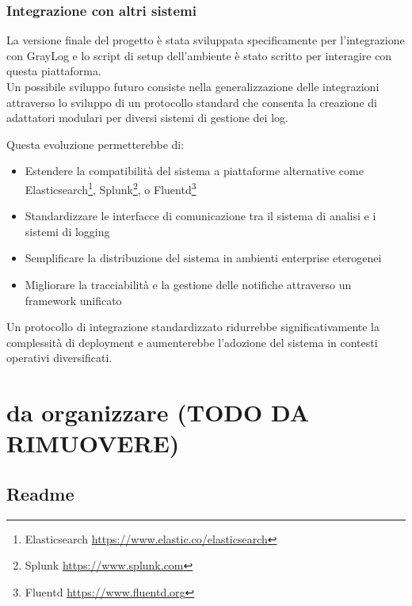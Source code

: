 \documentclass[12pt]{report}
\begin{document}
\subsection{Integrazione con altri sistemi}
\label{subsec:integrazione_sistemi}

La versione finale del progetto è stata sviluppata specificamente per l'integrazione con GrayLog e lo script di setup dell'ambiente è stato scritto per interagire con questa piattaforma. \\
Un possibile sviluppo futuro consiste nella generalizzazione delle integrazioni attraverso lo sviluppo di un protocollo standard che consenta la creazione di adattatori modulari per diversi sistemi di gestione dei log.

Questa evoluzione permetterebbe di:
\begin{itemize}
    \item Estendere la compatibilità del sistema a piattaforme alternative come Elasticsearch\footnote{Elasticsearch \url{https://www.elastic.co/elasticsearch}}, Splunk\footnote{Splunk \url{https://www.splunk.com}}, o Fluentd\footnote{Fluentd \url{https://www.fluentd.org}}
    \item Standardizzare le interfacce di comunicazione tra il sistema di analisi e i sistemi di logging
    \item Semplificare la distribuzione del sistema in ambienti enterprise eterogenei
    \item Migliorare la tracciabilità e la gestione delle notifiche attraverso un framework unificato
\end{itemize}

Un protocollo di integrazione standardizzato ridurrebbe significativamente la complessità di deployment e aumenterebbe l'adozione del sistema in contesti operativi diversificati.



\chapter{da organizzare (TODO DA RIMUOVERE)}
\label{chap:da_organizzare}

\section{Readme}
\label{sec:readme}
\end{document}

